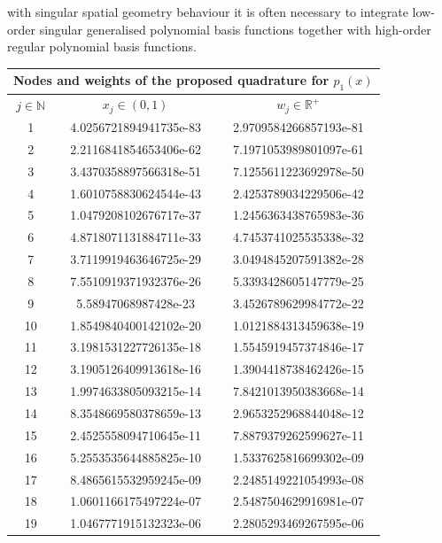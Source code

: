 \documentclass[a4paper, twosided]{book}
\begin{document}
with singular spatial geometry behaviour \cite{Graglia04,Graglia08} it is often necessary to integrate low-order singular generalised polynomial basis functions together with high-order regular polynomial basis functions. 

\newpage
\vspace{0.2cm}
\begin{table}[H]
\centering
\begin{tabular}{|c||c|c|}
\hline
\multicolumn{3}{|c|}{\textbf{Nodes and weights of the proposed quadrature for $p_1(x)$ }} \\
\hline
$j\in\mathbb{N}$ & $x_j\in(0,1)$ & $w_j\in\mathbb{R}^+$ \\
\hline
1   &  4.0256721894941735e-83  &  2.9709584266857193e-81  \\
2   &  2.2116841854653406e-62  &  7.1971053989801097e-61  \\
3   &  3.4370358897566318e-51  &  7.1255611223692978e-50  \\
4   &  1.6010758830624544e-43  &  2.4253789034229506e-42  \\
5   &  1.0479208102676717e-37  &  1.2456363438765983e-36  \\
6   &  4.8718071131884711e-33  &  4.7453741025535338e-32  \\
7   &  3.7119919463646725e-29  &  3.0494845207591382e-28  \\
8   &  7.5510919371932376e-26  &  5.3393428605147779e-25  \\
9   &  5.58947068987428e-23    &  3.4526789629984772e-22  \\
10  &  1.8549840400142102e-20  &  1.0121884313459638e-19  \\
11  &  3.1981531227726135e-18  &  1.5545919457374846e-17  \\
12  &  3.1905126409913618e-16  &  1.3904418738462426e-15  \\
13  &  1.9974633805093215e-14  &  7.8421013950383668e-14  \\
14  &  8.3548669580378659e-13  &  2.9653252968844048e-12  \\
15  &  2.4525558094710645e-11  &  7.8879379262599627e-11  \\
16  &  5.2553535644885825e-10  &  1.5337625816699302e-09  \\
17  &  8.4865615532959245e-09  &  2.2485149221054993e-08  \\
18  &  1.0601166175497224e-07  &  2.5487504629916981e-07  \\
19  &  1.0467771915132323e-06  &  2.2805293469267595e-06  \\

\end{tabular}
\end{table}
\end{document}
